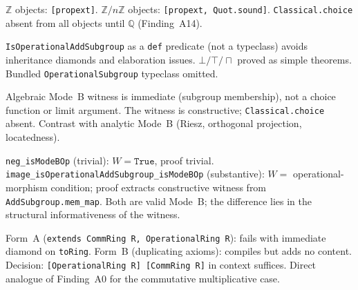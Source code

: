 \begin{finding}
\label{finding:A5}
\leanok
$\mathbb{Z}$ objects: \texttt{[propext]}.  $\mathbb{Z}/n\mathbb{Z}$
objects: \texttt{[propext, Quot.sound]}.
\texttt{Classical.choice} absent from all objects until $\mathbb{Q}$
(Finding~A14).
\end{finding}

\begin{finding}
\label{finding:A6}
\leanok
{}
\texttt{IsOperationalAddSubgroup} as a \texttt{def} predicate (not a
typeclass) avoids inheritance diamonds and elaboration issues.
$\bot/\top/\sqcap$ proved as simple theorems.  Bundled
\texttt{OperationalSubgroup} typeclass omitted.
\end{finding}

\begin{finding}
\label{finding:A7}
\leanok
{}
Algebraic Mode~B witness is immediate (subgroup membership), not a
choice function or limit argument.  The witness is constructive;
\texttt{Classical.choice} absent.  Contrast with analytic Mode~B (Riesz,
orthogonal projection, locatedness).
\end{finding}

\begin{finding}
\label{finding:A8}
\leanok
\texttt{neg\_isModeBOp} (trivial): $W = \texttt{True}$, proof trivial.
\texttt{image\_isOperationalAddSubgroup\_isModeBOp} (substantive):
$W = $ operational-morphism condition; proof extracts constructive witness
from \texttt{AddSubgroup.mem\_map}.  Both are valid Mode~B; the difference
lies in the structural informativeness of the witness.
\end{finding}

\begin{finding}
\label{finding:A9}
\leanok
Form~A (\texttt{extends CommRing R, OperationalRing R}): fails with
immediate diamond on \texttt{toRing}.
Form~B (duplicating axioms): compiles but adds no content.
Decision: \texttt{[OperationalRing R] [CommRing R]} in context suffices.
Direct analogue of Finding~A0 for the commutative multiplicative case.
\end{finding}

